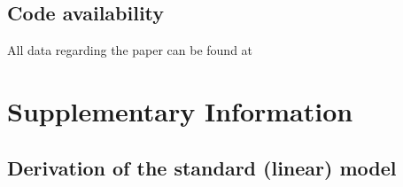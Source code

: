 \documentclass[lineno,sn-basic, Numbered]{sn-jnl}%
\theoremstyle{thmstyleone}%
\theoremstyle{thmstyletwo}%
\theoremstyle{thmstylethree}%
\begin{document}
\subsection{Code availability}
All data regarding the paper can be found at \cite{MathematicalCancer}


\bigskip






\section{Supplementary Information}\label{secA1}

\subsection{Derivation of the standard (linear) model}
\end{document}
